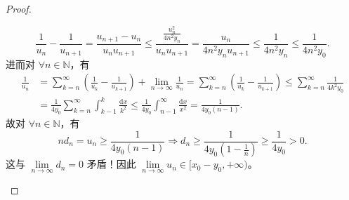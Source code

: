 \documentclass[../../main.tex]{subfiles}%
\begin{document}
\begin{proof}
\begin{enumerate}[(1)]
\[
\frac{1}{u_n} - \frac{1}{u_{n+1}} = \frac{u_{n+1} - u_n}{u_n u_{n+1}} \leqslant \frac{\frac{u_n^2}{4n^2 y_n}}{u_n u_{n+1}} = \frac{u_n}{4n^2 y_n u_{n+1}} \leqslant \frac{1}{4n^2 y_n} \leqslant \frac{1}{4n^2 y_0}.
\]
进而对 $\forall n \in \mathbb{N}$，有
\begin{align*}
\frac{1}{u_n} &= \sum_{k=n}^{\infty} \left( \frac{1}{u_k} - \frac{1}{u_{k+1}} \right) + \lim\limits_{n \to \infty} \frac{1}{u_n} = \sum_{k=n}^{\infty} \left( \frac{1}{u_k} - \frac{1}{u_{k+1}} \right) \leqslant \sum_{k=n}^{\infty} \frac{1}{4k^2 y_0}
\\
&= \frac{1}{4y_0}\sum_{k=n}^{\infty} \int_{k-1}^k \frac{\mathrm{d}x}{k^2} \leqslant \frac{1}{4y_0}\int_{n-1}^{\infty} \frac{\mathrm{d}x}{x^2} = \frac{1}{4y_0(n-1)}.
\end{align*}
故对 $\forall n \in \mathbb{N}$，有
\[
nd_n = u_n \geqslant \frac{1}{4y_0(n-1)} \Longrightarrow d_n \geqslant \frac{1}{4y_0\left(1 - \frac{1}{n}\right)} \geqslant \frac{1}{4y_0} > 0.
\]
这与 $\lim\limits_{n \to \infty} d_n = 0$ 矛盾！因此 $\lim\limits_{n \to \infty} u_n \in [x_0 - y_0, +\infty)$。
\end{enumerate}
\end{proof}
\end{document}
